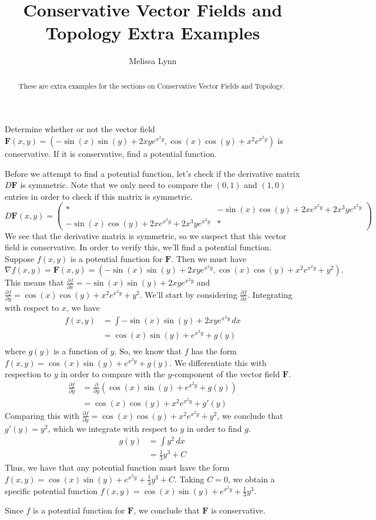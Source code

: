 \documentclass{ximera}
\title{Conservative Vector Fields and Topology Extra Examples}
\author{Melissa Lynn}
\begin{document}
  
\begin{abstract}  
These are extra examples for the sections on Conservative Vector Fields and Topology.
\end{abstract}  
\maketitle


\begin{example}
Determine whether or not the vector field $\mathbf{F}(x,y) = (-\sin(x)\sin(y)+2xye^{x^2y},\cos(x)\cos(y)+x^2e^{x^2y})$ is conservative. If it is conservative, find a potential function.
\begin{explanation}
Before we attempt to find a potential function, let's check if the derivative matrix $D\mathbf{F}$ is symmetric. Note that we only need to compare the $(0,1)$ and $(1,0)$ entries in order to check if this matrix is symmetric.
\[
D\mathbf{F}(x,y) = \left(\begin{array}{cc}
*&-\sin(x)\cos(y)+2xe^{x^2y}+2x^3ye^{x^2y}\\
-\sin(x)\cos(y)+2xe^{x^2y}+2x^3ye^{x^2y}&*\end{array}\right)
\]
We see that the derivative matrix is symmetric, so we suspect that this vector field is conservative. In order to verify this, we'll find a potential function.
Suppose $f(x,y)$ is a potential function for $\mathbf{F}$. Then we must have
\[
\nabla f(x,y)=\mathbf{F}(x,y)=(-\sin(x)\sin(y)+2xye^{x^2y},\cos(x)\cos(y)+x^2e^{x^2y}+y^2).
\]
This means that $\frac{\partial f}{\partial x} = -\sin(x)\sin(y)+2xye^{x^2y}$ and $\frac{\partial f}{\partial y} = \cos(x)\cos(y)+x^2e^{x^2y}+y^2$. We'll start by considering $\frac{\partial f}{\partial x}$. Integrating with respect to $x$, we have
\begin{align*}
f(x,y) &= \int -\sin(x)\sin(y)+2xye^{x^2y}\,dx\\
&= \cos(x)\sin(y)+e^{x^2y}+g(y)\\
\end{align*}
where $g(y)$ is a function of $y$. So, we know that $f$ has the form $f(x,y)=\cos(x)\sin(y)+e^{x^2y}+g(y)$. We differentiate this with respection to $y$ in order to compare with the $y$-component of the vector field $\mathbf{F}$.
\begin{align*}
\frac{\partial f}{\partial y} &= \frac{\partial}{\partial y}\left(\cos(x)\sin(y)+e^{x^2y}+g(y)\right)\\
&= \cos(x)\cos(y) + x^2e^{x^2y}+g'(y)
\end{align*}
Comparing this with $\frac{\partial f}{\partial y} = \cos(x)\cos(y)+x^2e^{x^2y}+y^2$, we conclude that $g'(y)=y^2$, which we integrate with respect to $y$ in order to find $g$.
\begin{align*}
g(y) &= \int y^2\,dx\\
&=\frac{1}{3}y^3+C
\end{align*}
Thus, we have that any potential function must have the form $f(x,y) = \cos(x)\sin(y)+e^{x^2y}+\frac{1}{3}y^3+C$. Taking $C=0$, we obtain a specific potential function $f(x,y) = \cos(x)\sin(y)+e^{x^2y}+\frac{1}{3}y^3$.

Since $f$ is a potential function for $\mathbf{F}$, we conclude that $\mathbf{F}$ is conservative.
\end{explanation}
\end{example}
\end{document}
